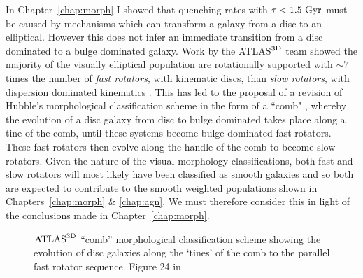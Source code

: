 In Chapter~\ref{chap:morph} I showed that quenching rates with $\tau < 1.5~\rm{Gyr}$ must be caused by mechanisms which can transform a galaxy from a disc to an elliptical. However this does not infer an immediate transition from a disc dominated to a bulge dominated galaxy. Work by the \textsc{ATLAS}$^{\rm{3D}}$ team \citep{cappellari11} showed the majority of the visually elliptical population are rotationally supported \citep{emsellem11} with $\sim7$ times the number of \emph{fast rotators}, with kinematic discs, than \emph{slow rotators}, with dispersion dominated kinematics \citep[see][]{cappellari07, emsellem07}.  This has led to the proposal of a revision of Hubble's morphological classification scheme in the form of a ``comb" \citep[see Figure~\ref{fig:atlascomb} originally from][]{cappellari16}, whereby the evolution of a disc galaxy from disc to bulge dominated takes place along a tine of the comb, until these systems become bulge dominated fast rotators. These fast rotators then evolve along the handle of the comb to become slow rotators. Given the nature of the visual morphology classifications, both fast and slow rotators will most likely have been classified as smooth galaxies and so both are expected to contribute to the smooth weighted populations shown in Chapters~\ref{chap:morph} \& \ref{chap:agn}. We must therefore consider this in light of the conclusions made in Chapter~\ref{chap:morph}. 


\begin{figure}
\caption[$\rm{ATLAS}^{\rm{3D}}$ ``comb'' morphological classification scheme from Cappellari (2016)]{$\rm{ATLAS}^{\rm{3D}}$ ``comb'' morphological classification scheme showing the evolution of disc galaxies along the `tines' of the comb to the parallel fast rotator sequence. Figure 24 in \cite{cappellari16}}
\label{fig:atlascomb}
\end{figure}

